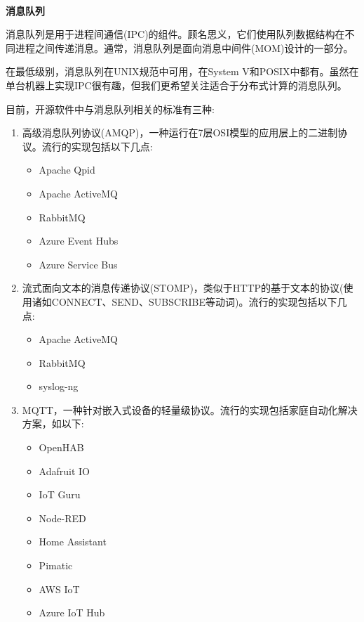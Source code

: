 \hspace*{\fill} \\ %
\noindent
\textbf{消息队列}

消息队列是用于进程间通信(IPC)的组件。顾名思义，它们使用队列数据结构在不同进程之间传递消息。通常，消息队列是面向消息中间件(MOM)设计的一部分。

在最低级别，消息队列在UNIX规范中可用，在System V和POSIX中都有。虽然在单台机器上实现IPC很有趣，但我们更希望关注适合于分布式计算的消息队列。

目前，开源软件中与消息队列相关的标准有三种:

\begin{enumerate}
\item 
高级消息队列协议(AMQP)，一种运行在7层OSI模型的应用层上的二进制协议。流行的实现包括以下几点:

\begin{itemize}
\item 
Apache Qpid

\item 
Apache ActiveMQ

\item 
RabbitMQ

\item 
Azure Event Hubs

\item 
Azure Service Bus
\end{itemize}

\item 
流式面向文本的消息传递协议(STOMP)，类似于HTTP的基于文本的协议(使用诸如CONNECT、SEND、SUBSCRIBE等动词)。流行的实现包括以下几点:

\begin{itemize}
\item 
Apache ActiveMQ

\item 
RabbitMQ

\item 
syslog-ng
\end{itemize}

\item 
MQTT，一种针对嵌入式设备的轻量级协议。流行的实现包括家庭自动化解决方案，如以下:

\begin{itemize}
\item 
OpenHAB

\item 
Adafruit IO

\item 
IoT Guru

\item 
Node-RED

\item 
Home Assistant

\item 
Pimatic

\item 
AWS IoT

\item 
Azure IoT Hub
\end{itemize}

\end{enumerate}

